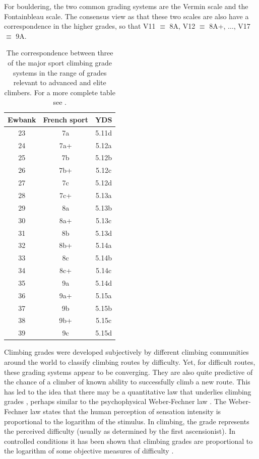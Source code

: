 \documentclass[ba]{imsart}
\begin{document}
For bouldering, the two common grading systems are the Vermin scale and the Fontainbleau scale. The consensus view as that these two scales are also have a correspondence in the higher grades, so that V11 $\equiv$ 8A, V12 $\equiv$ 8A+, $\dots$, V17 $\equiv$ 9A.


\begin{table}
\centering
\begin{tabular}{| c | c | c |}
  \hline
  {\bf Ewbank} & {\bf French sport} & {\bf YDS} \\
  \hline
  23 & 7a & 5.11d \\
  24 & 7a+ & 5.12a \\
  25 & 7b & 5.12b \\
  26 & 7b+ & 5.12c \\
  27 & 7c & 5.12d \\
  28 & 7c+ & 5.13a \\
  29 & 8a & 5.13b \\
  30 & 8a+ & 5.13c \\
  31 & 8b & 5.13d \\
  32 & 8b+ & 5.14a \\
  33 & 8c & 5.14b \\
  34 & 8c+ & 5.14c \\
  35 & 9a & 5.14d \\
  36 & 9a+ & 5.15a \\
  37 & 9b & 5.15b \\
  38 & 9b+ & 5.15c \\
  39 & 9c & 5.15d \\
  \hline
\end{tabular}
\caption{The correspondence between three of the major sport climbing grade systems in the range of grades relevant to advanced and elite climbers. For a more complete table see \citet{draper2015comparative}. }
\label{table1}
\end{table}

Climbing grades were developed subjectively by different climbing communities around the world to classify climbing routes by difficulty. Yet, for difficult routes, these grading systems appear to be converging. They are also quite predictive of the chance of a climber of known ability to successfully climb a new route.  This has led to the idea that there may be a quantitative law that underlies climbing grades \citep{delignieres1993psychophysical}, perhaps similar to the psychophysical Weber-Fechner law \citep{1834pulsu,fechner1860}. The Weber-Fechner law states that the human perception of sensation intensity is proportional to the logarithm of the stimulus.  In climbing, the grade represents the perceived difficulty (usually as determined by the first ascensionist). In controlled conditions it has been shown that climbing grades are proportional to the logarithm of some objective measures of difficulty \citep{delignieres1993psychophysical}.
\end{document}
